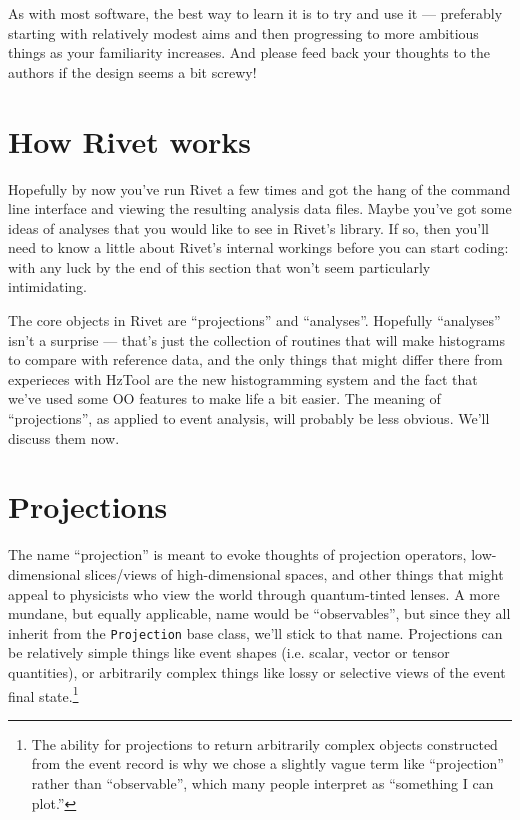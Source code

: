 \documentclass{JHEP3}
\newcommand{\kbd}[1]{\texttt{#1}\xspace}
\begin{document}
As with most software, the best way to learn it is to try and use it ---
preferably starting with relatively modest aims and then progressing to more
ambitious things as your familiarity increases. And please feed back your
thoughts to the authors if the design seems a bit screwy!



\section{How Rivet works}
Hopefully by now you've run Rivet a few times and got the hang of the command
line interface and viewing the resulting analysis data files. Maybe you've got
some ideas of analyses that you would like to see in Rivet's library. If so,
then you'll need to know a little about Rivet's internal workings before you can
start coding: with any luck by the end of this section that won't seem
particularly intimidating.

The core objects in Rivet are ``projections'' and ``analyses''. Hopefully
``analyses'' isn't a surprise --- that's just the collection of routines that
will make histograms to compare with reference data, and the only things that
might differ there from experieces with HzTool are the new histogramming system
and the fact that we've used some OO features to make life a bit easier. The
meaning of ``projections'', as applied to event analysis, will probably be less
obvious. We'll discuss them now.


\section{Projections}
The name ``projection'' is meant to evoke thoughts of
projection operators, low-dimensional slices/views of high-dimensional spaces,
and other things that might appeal to physicists who view the world through
quantum-tinted lenses. A more mundane, but equally applicable, name would be
``observables'', but since they all inherit from the \kbd{Projection} base
class, we'll stick to that name. Projections can be relatively simple things
like event shapes (i.e. scalar, vector or tensor quantities), or arbitrarily
complex things like lossy or selective views of the event final
state.\footnote{The ability for projections to return arbitrarily complex objects
  constructed from the event record is why we chose a slightly vague term like
  ``projection'' rather than ``observable'', which many people interpret as
  ``something I can plot.''}
\end{document}
